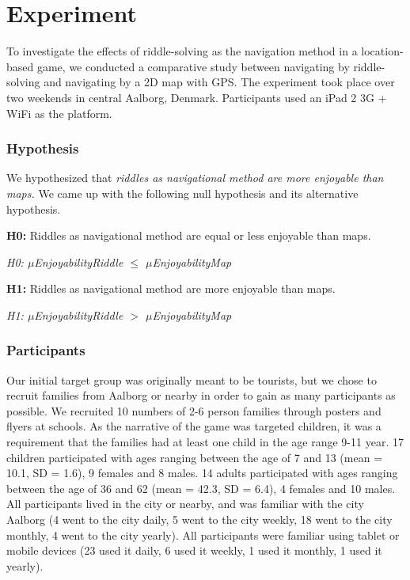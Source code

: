\section{Experiment}

To investigate the effects of riddle-solving as the navigation method in a location-based game, we conducted a comparative study between navigating by riddle-solving and navigating by a 2D map with GPS. The experiment took place over two weekends in central Aalborg, Denmark. Participants used an iPad 2 3G + WiFi as the platform.

\subsubsection{Hypothesis}

We hypothesized that \textit{riddles as navigational method are more enjoyable than maps.} We came up with the following null hypothesis and its alternative hypothesis.

\textbf{H0:} Riddles as navigational method are equal or less enjoyable than maps. 

\hspace{10 mm} \textit{H0: $\mu$EnjoyabilityRiddle $\leq$ $\mu$EnjoyabilityMap}

\textbf{H1:} Riddles as navigational method are more enjoyable than maps.

\hspace{10 mm} \textit{H1: $\mu$EnjoyabilityRiddle $>$ $\mu$EnjoyabilityMap}

\subsubsection{Participants}

Our initial target group was originally meant to be tourists, but we chose to recruit families from Aalborg or nearby in order to gain as many participants as possible. We recruited 10 numbers of 2-6 person families through posters and flyers at schools. 
As the narrative of the game was targeted children, it was a requirement that the families had at least one child in the age range 9-11 year. 17 children participated with ages ranging between the age of 7 and 13 (mean = 10.1, SD = 1.6), 9 females and 8 males. 14 adults participated with ages ranging between the age of 36 and 62 (mean = 42.3, SD = 6.4), 4 females and 10 males.  All participants lived in the city or nearby, and was familiar with the city Aalborg (4 went to the city daily, 5 went to the city weekly, 18 went to the city monthly, 4 went to the city yearly). All participants were familiar using tablet or mobile devices (23 used it daily, 6 used it weekly, 1 used it monthly, 1 used it yearly).



